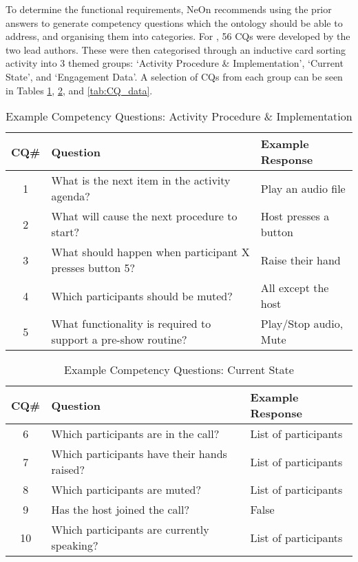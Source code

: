 To determine the functional requirements, NeOn recommends using the prior answers to generate competency questions which the ontology should be able to address, and organising them into categories. For \ONT{}, 56 CQs were developed by the two lead authors. These were then categorised through an inductive card sorting activity into 3 themed groups: `Activity Procedure \& Implementation', `Current State', and `Engagement Data'. A selection of CQs from each group can be seen in Tables \ref{tab:CQ_activity}, \ref{tab:CQ_state}, and \ref{tab:CQ_data}.

\begin{table}
  \caption{Example Competency Questions: Activity Procedure \& Implementation}
  \label{tab:CQ_activity}
  \begin{tabular}{cll}
    \toprule
    CQ\#&Question&Example Response\\
    \midrule
    1&What is the next item in the activity agenda?&Play an audio file\\
    2&What will cause the next procedure to start?&Host presses a button\\
    3&What should happen when participant X presses button 5?&Raise their hand\\
    4&Which participants should be muted?&All except the host\\
    5&What functionality is required to support a pre-show routine?&Play/Stop audio, Mute\\
  \bottomrule
\end{tabular}
\end{table}

\begin{table}
  \caption{Example Competency Questions: Current State}
  \label{tab:CQ_state}
  \begin{tabular}{cll}
    \toprule
    CQ\#&Question&Example Response\\
    \midrule
    6&Which participants are in the call?&List of participants\\
    7&Which participants have their hands raised?&List of participants\\
    8&Which participants are muted?&List of participants\\
    9&Has the host joined the call?&False\\
    10&Which participants are currently speaking?&List of participants\\
  \bottomrule
\end{tabular}
\end{table}


